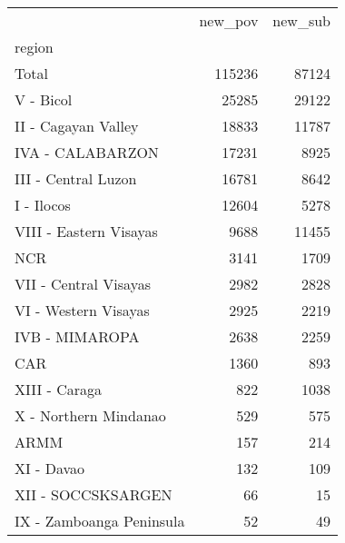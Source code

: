 \begin{tabular}{lrr}
\toprule
{} &  new\_pov &  new\_sub \\
region                   &          &          \\
\midrule
Total                    &   115236 &    87124 \\
V - Bicol                &    25285 &    29122 \\
II - Cagayan Valley      &    18833 &    11787 \\
IVA - CALABARZON         &    17231 &     8925 \\
III - Central Luzon      &    16781 &     8642 \\
I - Ilocos               &    12604 &     5278 \\
VIII - Eastern Visayas   &     9688 &    11455 \\
NCR                      &     3141 &     1709 \\
VII - Central Visayas    &     2982 &     2828 \\
VI - Western Visayas     &     2925 &     2219 \\
IVB - MIMAROPA           &     2638 &     2259 \\
CAR                      &     1360 &      893 \\
XIII - Caraga            &      822 &     1038 \\
X - Northern Mindanao    &      529 &      575 \\
ARMM                     &      157 &      214 \\
XI - Davao               &      132 &      109 \\
XII - SOCCSKSARGEN       &       66 &       15 \\
IX - Zamboanga Peninsula &       52 &       49 \\
\bottomrule
\end{tabular}
